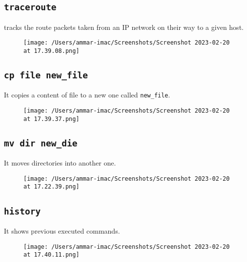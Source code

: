 \documentclass{article}
\def\code#1{\texttt{#1}}
\begin{document}
\subsection{\code{traceroute}}%
tracks the route packets taken from an IP network on their way to a given host.
\begin{figure}[ht]
  \centering
  \texttt{[image: /Users/ammar-imac/Screenshots/Screenshot 2023-02-20 at 17.39.08.png]}
\end{figure}

\subsection{\code{cp file new\_file}}%
It copies a content of file  to a new one called \code{new\_file}.
\begin{figure}[ht]
  \centering
  \texttt{[image: /Users/ammar-imac/Screenshots/Screenshot 2023-02-20 at 17.39.37.png]}
\end{figure}

\newpage

\subsection{\code{mv dir new\_die}}%
It moves directories into another one.
\begin{figure}[ht]
  \centering
  \texttt{[image: /Users/ammar-imac/Screenshots/Screenshot 2023-02-20 at 17.22.39.png]}
\end{figure}


\subsection{\code{history}}%
It shows  previous executed commands.
\begin{figure}[ht]
  \centering
  \texttt{[image: /Users/ammar-imac/Screenshots/Screenshot 2023-02-20 at 17.40.11.png]}
\end{figure}
\end{document}

